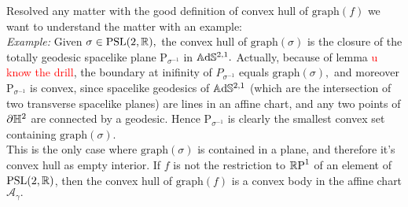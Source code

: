 Resolved any matter with the good definition of convex hull of $\text{graph}(f)$ we want to understand the matter with an example: \\
\textit{Example:} Given $\sigma \in \PSL,$ the convex hull of $\text{graph}(\sigma)$ is the closure of the totally geodesic spacelike plane $\text{P}_{\sigma^{-1}}$ in $\A^{2,1}.$ Actually, because of lemma \textcolor{red}{u know the drill}, the boundary at inifinity of $P_{\sigma^{-1}}$ equals $\text{graph}(\sigma),$ and moreover $\text{P}_{\sigma^{-1}}$ is convex, since spacelike geodesics of $\A^{2,1}$ (which are the intersection of two transverse spacelike planes) are lines in an affine chart, and any two points of $\partial\H^2$ are connected by a geodesic. Hence $\text{P}_{\sigma^{-1}}$ is clearly the smallest convex set containing $\text{graph}(\sigma).$\\
This is the only case where $\text{graph}(\sigma)$ is contained in a plane, and therefore it's convex hull as empty interior. If $f$ is not the restriction to $\S$ of an element of $\PSL$, then the convex hull of $\text{graph}(f)$ is a convex body in the affine chart $\mathcal{A}_\gamma.$


